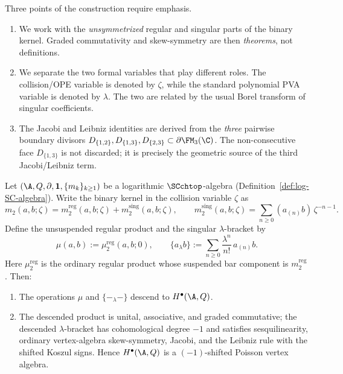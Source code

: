Three points of the construction require emphasis.

\begin{enumerate}[label=\textup{(\arabic*)}]
\item We work with the \emph{unsymmetrized} regular and singular parts of the binary kernel.
 Graded commutativity and skew-symmetry are then \emph{theorems}, not definitions.
\item We separate the two formal variables that play different roles. The collision/OPE
 variable is denoted by $\zeta$, while the standard polynomial PVA variable is denoted
 by $\lambda$. The two are related by the usual Borel transform of singular coefficients.
\item The Jacobi and Leibniz identities are derived from the \emph{three} pairwise
 boundary divisors $D_{\{1,2\}},D_{\{1,3\}},D_{\{2,3\}}\subset \partial\FM_3(\C)$.
 The non-consecutive face $D_{\{1,3\}}$ is not discarded; it is precisely the geometric
 source of the third Jacobi/Leibniz term.
\end{enumerate}

\begin{maintheorem}
\label{thm:cohomology-PVA-main}%
\label{thm:cohomology_PVA}%
\label{thm:pva-coisson-bridge}%
Let $(\A,Q,\partial,\mathbf 1,\{m_k\}_{k\ge1})$ be a
logarithmic\/ $\SCchtop$-algebra
\textup{(}Definition~\textup{\ref{def:log-SC-algebra})}.
Write the binary kernel in the collision variable $\zeta$ as
\[
m_2(a,b;\zeta)=m_2^{\mathrm{reg}}(a,b;\zeta)+m_2^{\mathrm{sing}}(a,b;\zeta),
\qquad
m_2^{\mathrm{sing}}(a,b;\zeta)=\sum_{n\ge0}(a_{(n)}b)\,\zeta^{-n-1}.
\]
Define the unsuspended regular product and the singular
$\lambda$-bracket by
\[
\mu(a,b):=\mu_2^{\mathrm{reg}}(a,b;0),
\qquad
\{a_\lambda b\}:=\sum_{n\ge0}\frac{\lambda^n}{n!}\,a_{(n)}b.
\]
Here $\mu_2^{\mathrm{reg}}$ is the ordinary regular product whose
suspended bar component is $m_2^{\mathrm{reg}}$.
Then:

\begin{enumerate}[label=\textup{(\roman*)}]
\item The operations $\mu$ and $\{-{}_\lambda-\}$ descend to $H^\bullet(\A,Q)$.
\item The descended product is unital, associative, and graded commutative; the descended
 $\lambda$-bracket has cohomological degree $-1$ and satisfies sesquilinearity,
 ordinary vertex-algebra skew-symmetry, Jacobi, and the Leibniz rule
 with the shifted Koszul signs. Hence
 $H^\bullet(\A,Q)$ is a $(-1)$-shifted Poisson vertex algebra.
\end{enumerate}
\end{maintheorem}

